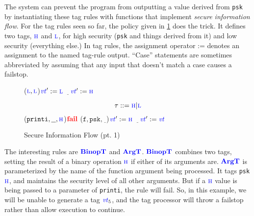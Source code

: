 \documentclass{llncs}
\begin{document}
{The system can prevent the program from outputting a value derived from {\tt psk} by instantiating these tag rules with
functions that implement {\em secure information flow}. For the tag rules seen so far, the policy given in
\cref{fig:example1rules} does the trick. It defines two tags, \(\textnormal{\color{blue} \sc h}\) and \(\textnormal{\color{blue} \sc l}\), for high
security ({\tt psk} and things derived from it) and low security (everything else.) In tag rules,
the assignment operator := denotes an assignment to the named tag-rule output. 
``Case'' statements are sometimes abbreviated by assuming that any input that doesn't match a case causes a failstop.

\begin{figure}
  \begin{minipage}{0.5\textwidth}
    \consttruleblock{\(\vt := \low\)}
    \localtruleblock{\(\vt := \low\)}

    \binoptruleblock
        {
          {(\(\textnormal{\color{blue} \sc l},\textnormal{\color{blue} \sc l}\))}{\(\mathit{\color{blue} vt}':=\textnormal{\color{blue} \sc l}\)}
          {\(\underline{~~~}\)}{\(\mathit{\color{blue} vt}':=\textnormal{\color{blue} \sc h}\)}}
  \end{minipage}
  \begin{minipage}{0.4\textwidth}
    \[\tau::=\textnormal{\color{blue} \sc h} | \textnormal{\color{blue} \sc l}\]
    \argtruleblock
        {
          {(\(\mathtt{printi},\underline{~~},\textnormal{\color{blue} \sc h}\))}{\(\mathbf{\color{red} fail}\)}
          {(\(\mathtt{f},\mathtt{psk},\underline{~~}\))}{\(\mathit{\color{blue} vt}':=\textnormal{\color{blue} \sc h}\)}
          {\(\underline{~~~}\)}{\(\mathit{\color{blue} vt}':=\mathit{\color{blue} vt}\)}}
  \end{minipage}

  \caption{Secure Information Flow (pt. 1)}
  \label{fig:example1rules}
\end{figure}

The interesting rules are \(\color{blue} \mathbf{BinopT}\) and \(\color{blue} \mathbf{ArgT}\). \(\color{blue} \mathbf{BinopT}\)
combines two tags, setting the result of a binary operation \(\textnormal{\color{blue} \sc h}\) if either of its arguments are.
\(\color{blue} \mathbf{ArgT}\) is parameterized by the name of the function argument being processed.
It tags {\tt psk} \(\textnormal{\color{blue} \sc h}\), and maintains the security level of all other arguments.
But if a \(\textnormal{\color{blue} \sc h}\) value is being passed to a parameter of {\tt printi}, the rule will fail.
So, in this example, we will be unable to generate a tag
\(\mathit{\color{blue} vt}_5\), and the tag processor will throw a failstop rather than allow execution to continue.

}
\end{document}
